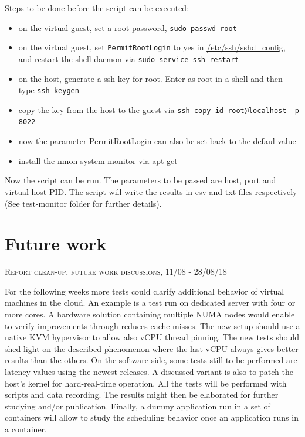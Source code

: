 \documentclass[]{scrartcl}
\begin{document}
Steps to be done before the script can be executed:

\begin{itemize}
	\item on the virtual guest, set a root password, \texttt{sudo passwd root}
	\item on the virtual guest, set \texttt{PermitRootLogin} to yes in \url{/etc/ssh/sshd_config}, and restart the shell daemon via \texttt{sudo service ssh restart}
	\item on the host, generate a ssh key for root. Enter as root in a shell and then type \texttt{ssh-keygen}
	\item copy the key from the host to the guest via \texttt{ssh-copy-id root@localhost -p 8022}
	\item now the parameter PermitRootLogin can also be set back to the defaul value
	\item install the nmon system monitor via apt-get
\end{itemize}

Now the script can be run. The parameters to be passed are host, port and virtual host PID. The script will write the results in csv and txt files respectively (See test-monitor folder for further details). 

\section{Future work}

{\small\textsc{Report clean-up, future work discussions, 11/08 - 28/08/18} \bigskip}

For the following weeks more tests could clarify additional behavior of virtual machines in the cloud. An example is a test run on dedicated server with four or more cores. A hardware solution containing multiple NUMA nodes would enable to verify improvements through reduces cache misses.
The new setup should use a native KVM hypervisor to allow also vCPU thread pinning. The new tests should shed light on the described phenomenon where the last vCPU always gives better results than the others.
On the software side, some tests still to be performed are latency values using the newest releases. A discussed variant is also to patch the host's kernel for hard-real-time operation.
All the tests will be performed with scripts and data recording. The results might then be elaborated for further studying and/or publication.
Finally, a dummy application run in a set of containers will allow to study the scheduling behavior once an application runs in a container.
\end{document}

